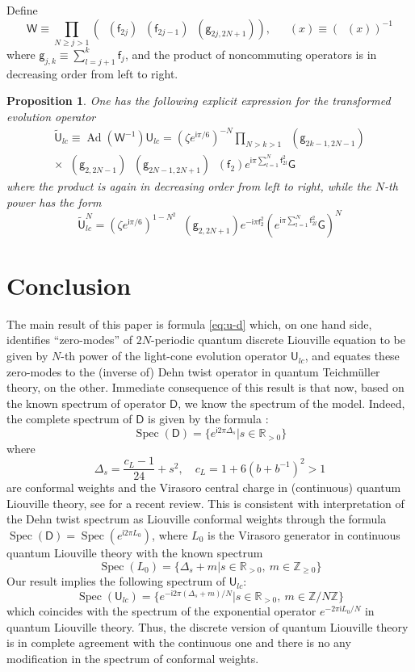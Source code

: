 \documentclass[a4paper,draft]{amsart}
\newtheorem{proposition}{Proposition}
\theoremstyle{definition}
\theoremstyle{remark}
\DeclareMathOperator{\Ad}{Ad}
\newcommand{\DEHN}{\mathsf D}
\newcommand{\GEN}{\mathsf f}
\newcommand{\GENI}{\mathsf g}
\newcommand{\IMUN}{\mathsf i}
\newcommand{\INTEGERS}{\mathbb Z}
\newcommand{\la}{b}
\newcommand{\LC}{\mathsf U_{lc}}
\newcommand{\QDILOG}{\mathop{\varphi_b}}
\newcommand{\QDILOGI}{\mathop{\bar{\varphi}_b}}
\newcommand{\REALS}{\mathbb R}
\newcommand{\SHFL}{\mathsf G}
\newcommand{\SIM}{\mathsf W}
\newcommand{\Spec}{\mathop{\mathrm{Spec}}}
\newcommand{\TLC}{\tilde {\mathsf U}_{lc}}
\begin{document}
Define
\[
\SIM\equiv\prod_{N\ge j>1}\left(\QDILOGI(\GEN_{2j})\QDILOG(\GEN_{2j-1})
\QDILOG(\GENI_{2j,2N+1})\right),\quad 
\QDILOGI(x)\equiv (\QDILOG(x))^{-1}
\]
where
\(
\GENI_{j,k}\equiv\sum_{l=j+1}^k\GEN_{j}
\), and the product of noncommuting operators is in decreasing order 
from left to right.
\begin{proposition}
One has the following explicit expression for the 
transformed evolution operator
\begin{multline*}
\TLC\equiv \Ad(\SIM^{-1})\LC=(\zeta e^{\IMUN\pi/6})^{-N}
\prod_{N>k>1}\QDILOGI(\GENI_{2k-1,2N-1})\\
\times
\QDILOGI(\GENI_{2,2N-1})\QDILOG(\GENI_{2N-1,2N+1})
\QDILOGI(\GEN_{2})e^{\IMUN\pi\sum_{l=1}^N\GEN_{2l}^2}\SHFL
\end{multline*}
where the product is again in decreasing order 
from left to right, while the $N$-th power has the form
\[
\TLC^{N}=(\zeta e^{\IMUN\pi/6})^{1-N^2}
\QDILOG(\GENI_{2,2N+1})e^{-\IMUN\pi\GEN_2^2}
\left( e^{\IMUN\pi\sum_{l=1}^N\GEN_{2l}^2}\SHFL\right)^{N}
\] 
\end{proposition}
\section*{Conclusion}

The main result of this paper is formula \eqref{eq:u-d}
which, on one hand side, identifies ``zero-modes'' of $2N$-periodic
quantum discrete 
Liouville equation to be given by $N$-th power of the light-cone
evolution operator $\LC$, and equates these
zero-modes to the (inverse 
of) Dehn twist operator in quantum Teichm\"uller theory, on the other.
Immediate consequence of this result is that now, based on the
known spectrum of operator $\DEHN$, we know the
spectrum of the model. Indeed, the 
complete spectrum of $\DEHN$ is given by the formula \cite{kash3}:
\[
\Spec(\DEHN)=\{e^{\IMUN2\pi\Delta_s}|s\in\REALS_{>0}\}
\]
where
\[
\Delta_s=\frac{c_L-1}{24}+s^2,\quad c_L=1+6(\la+\la^{-1})^2>1
\]
are conformal weights and the Virasoro central charge in (continuous) quantum
Liouville theory, see \cite{tesch} for a recent review. 
This is consistent with interpretation of the Dehn
twist spectrum as Liouville conformal weights through the formula
$\Spec(\DEHN)=\Spec( e^{\IMUN2\pi L_0})$, where $L_0$ is the Virasoro
generator in continuous quantum Liouville theory with the known
spectrum
\[
\Spec(L_0)=\{\Delta_s+m|s\in\REALS_{>0},\ m\in\INTEGERS_{\ge 0}\}
\]
Our result implies the following spectrum of $\LC$:
\[
\Spec(\LC)=\{e^{-\IMUN2\pi (\Delta_s+m)/N}|s\in\REALS_{>0},\ m
\in\INTEGERS/N\INTEGERS\}
\]
which coincides with the spectrum of the exponential operator
$e^{-2\pi\IMUN L_0/N}$ in quantum Liouville theory.  Thus, the
discrete version of quantum Liouville theory is in complete agreement
with the continuous one and there is no any modification in the
spectrum of conformal weights.
\end{document}
